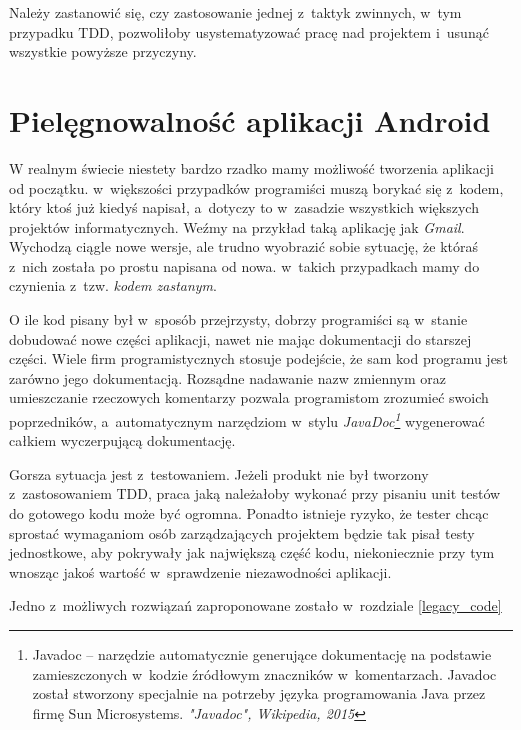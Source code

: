 Należy zastanowić się, czy zastosowanie jednej z~taktyk zwinnych, w~tym przypadku TDD, pozwoliłoby usystematyzować pracę nad projektem i~usunąć wszystkie powyższe przyczyny.

\section{Pielęgnowalność aplikacji Android}
\label{pielegnowalnosc_aplikacji}
W realnym świecie niestety bardzo rzadko mamy możliwość tworzenia aplikacji od początku. w~większości przypadków programiści muszą borykać się z~kodem, który ktoś już kiedyś napisał, a~dotyczy to w~zasadzie wszystkich większych projektów informatycznych. Weźmy na przykład taką aplikację jak \textit{Gmail}. Wychodzą ciągle nowe wersje, ale trudno wyobrazić sobie sytuację, że któraś z~nich została po prostu napisana od nowa. w~takich przypadkach mamy do czynienia z~tzw. \textit{kodem zastanym}.

O ile kod pisany był w~sposób przejrzysty, dobrzy programiści są w~stanie dobudować nowe części aplikacji, nawet nie mając dokumentacji do starszej części. Wiele firm programistycznych stosuje podejście, że sam kod programu jest zarówno jego dokumentacją. Rozsądne nadawanie nazw zmiennym oraz umieszczanie rzeczowych komentarzy pozwala programistom zrozumieć swoich poprzedników, a~automatycznym narzędziom w~stylu \textit{JavaDoc\footnote{Javadoc – narzędzie automatycznie generujące dokumentację na podstawie zamieszczonych w~kodzie źródłowym znaczników w~komentarzach. Javadoc został stworzony specjalnie na potrzeby języka programowania Java przez firmę Sun Microsystems. \textit{"Javadoc", Wikipedia, 2015}}} wygenerować całkiem wyczerpującą dokumentację.

Gorsza sytuacja jest z~testowaniem. Jeżeli produkt nie był tworzony z~zastosowaniem TDD, praca jaką należałoby wykonać przy pisaniu unit testów do gotowego kodu może być ogromna. Ponadto istnieje ryzyko, że tester chcąc sprostać wymaganiom osób zarządzających projektem będzie tak pisał testy jednostkowe, aby pokrywały jak największą część kodu, niekoniecznie przy tym wnosząc jakoś wartość w~sprawdzenie niezawodności aplikacji.

Jedno z~możliwych rozwiązań zaproponowane zostało w~rozdziale \ref{legacy_code}